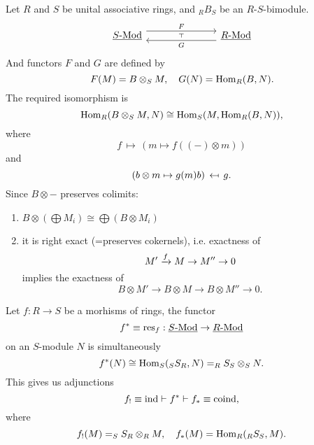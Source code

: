 \begin{examples*}
	\item Let \( R \) and \( S \) be unital associative rings, and \( _R B_S \) be an \( R\text{-}S \)-bimodule.
		\[
			\begin{tikzcd}{\ctRMod[S]} &&& {\ctRMod}
				\arrow[""{name=0, anchor=center, inner sep=0}, "F", shift left=2, from=1-1, to=1-4]
				\arrow[""{name=1, anchor=center, inner sep=0}, "G", shift left=2, from=1-4, to=1-1]
				\arrow["\adj"{anchor=center, rotate=-90}, draw=none, from=0, to=1]
			\end{tikzcd}
		\]
		And functors \( F \) and \( G \) are defined by
		\[
			F(M) = B \otimes_S M, \quad G(N) = \Hom_R(B, N).
		\]
		The required isomorphism is
		\[
			\Hom_R(B \otimes_S M, N) \cong \Hom_S(M, \Hom_R(B, N)),
		\]
		where
		\[
			f \,\mapsto\, (m \mapsto f((-) \otimes m))
		\]
		and
		\[
			(b \otimes m \mapsto g(m) b) \,\mapsot\, g.
		\]
		Since \( B \otimes - \) preserves colimits:
		\begin{enumerate}
			\item \( B \otimes (\bigoplus M_i) \cong \bigoplus (B \otimes M_i) \)
			\item it is right exact (=preserves cokernels), i.e. exactness of
				\[
					M' \tox{f} M \to M'' \to 0
				\]
				implies the exactness of
				\[
					B \otimes M' \to B \otimes M \to B \otimes M'' \to 0.
				\]
		\end{enumerate}
\end{examples*}

\begin{remark*}
	Let \( f: R \to S \) be a morhisms of rings, the  functor
	\[
		f^* \equiv \opn{res}_f: \ctRMod[S] \to \ctRMod
	\]
	on an \( S \)-module \( N \) is simultaneously
	\[
		f^*(N) \cong \Hom_S(_S S_R, N) = _R S_S \otimes_S N.
	\]
	This gives us adjunctions
	\[
		f_! \equiv \opn{ind} \adj f^* \adj f_* \equiv \opn{coind},
	\]
	where
	\[
		f_!(M) = _S S_R \otimes_R M, \quad f_*(M) = \Hom_R(_R S_S, M).
	\]
\end{remark*}